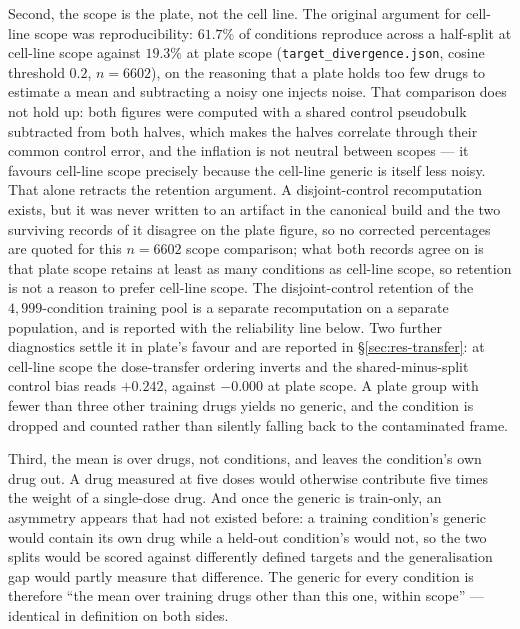Second, the scope is the plate, not the cell line. The original argument for cell-line scope was
reproducibility: $61.7\%$ of conditions reproduce across a half-split at cell-line scope against
$19.3\%$ at plate scope (\texttt{target\_divergence.json}, cosine threshold $0.2$, $n = 6602$), on the reasoning that a plate holds too few drugs to estimate a mean and
subtracting a noisy one injects noise. That comparison does not hold up: both figures were computed
with a shared control pseudobulk subtracted from both halves, which makes the halves correlate
through their common control error, and the inflation is not neutral between scopes --- it favours
cell-line scope precisely because the cell-line generic is itself less noisy. That alone retracts the
retention argument. A disjoint-control recomputation exists, but it was never written to an artifact
in the canonical build and the two surviving records of it disagree on the plate figure, so no
corrected percentages are quoted for this $n = 6602$ scope comparison; what both records agree on is
that plate scope retains at least as many conditions as cell-line scope, so retention is not a reason
to prefer cell-line scope. The disjoint-control retention of the $4{,}999$-condition training pool is
a separate recomputation on a separate population, and is reported with the reliability line below.
Two further diagnostics settle it in plate's favour and are reported in \S\ref{sec:res-transfer}: at
cell-line scope the dose-transfer ordering inverts and the shared-minus-split control bias reads
$+0.242$, against $-0.000$ at plate scope. A plate group with fewer than three other training drugs
yields no generic, and the condition is dropped and counted rather than silently falling back to the
contaminated frame.

Third, the mean is over drugs, not conditions, and leaves the condition's own drug out. A drug
measured at five doses would otherwise contribute five times the weight of a single-dose drug. And
once the generic is train-only, an asymmetry appears that had not existed before: a training
condition's generic would contain its own drug while a held-out condition's would not, so the two
splits would be scored against differently defined targets and the generalisation gap would partly
measure that difference. The generic for every condition is therefore ``the mean over training drugs
other than this one, within scope'' --- identical in definition on both sides.

